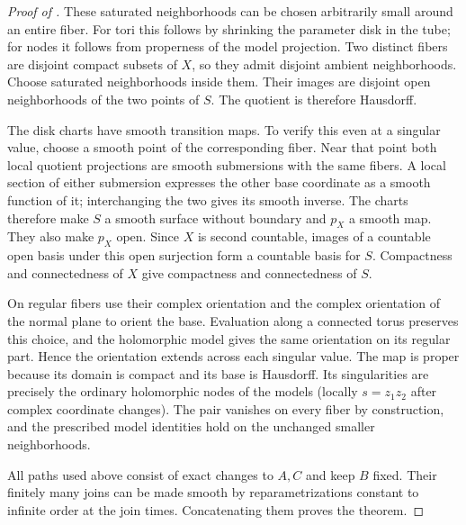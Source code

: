 \begin{proof}[Proof of ]
These saturated neighborhoods can be chosen arbitrarily small
around an entire fiber.  For tori this follows by shrinking the
parameter disk in the tube; for nodes it follows from properness of
the model projection.  Two distinct fibers are disjoint compact
subsets of $X$, so they admit disjoint ambient neighborhoods.
Choose saturated neighborhoods inside them.  Their images are
disjoint open neighborhoods of the two points of $S$.  The quotient
is therefore Hausdorff.

The disk charts have smooth transition maps.  To verify this even
at a singular value, choose a smooth point of the corresponding
fiber.  Near that point both local quotient projections are smooth
submersions with the same fibers.  A local section of either
submersion expresses the other base coordinate as a smooth function
of it; interchanging the two gives its smooth inverse.  The charts
therefore make $S$ a smooth surface without boundary and $p_X$ a
smooth map.  They also make $p_X$ open.  Since $X$ is second
countable, images of a countable open basis under this open
surjection form a countable basis for $S$.  Compactness and
connectedness of $X$ give compactness and connectedness of $S$.

On regular fibers use their complex orientation and the complex
orientation of the normal plane to orient the base.  Evaluation
along a connected torus preserves this choice, and the holomorphic
model gives the same orientation on its regular part.  Hence the
orientation extends across each singular value.  The map is proper
because its domain is compact and its base is Hausdorff.  Its
singularities are precisely the ordinary holomorphic nodes of the
models (locally $s=z_1z_2$ after complex coordinate changes).
The pair vanishes on every fiber by construction, and the prescribed
model identities hold on the unchanged smaller neighborhoods.

All paths used above consist of exact changes to $A,C$ and keep
$B$ fixed.  Their finitely many joins can be made smooth by
reparametrizations constant to infinite order at the join times.
Concatenating them proves the theorem.
\end{proof}
